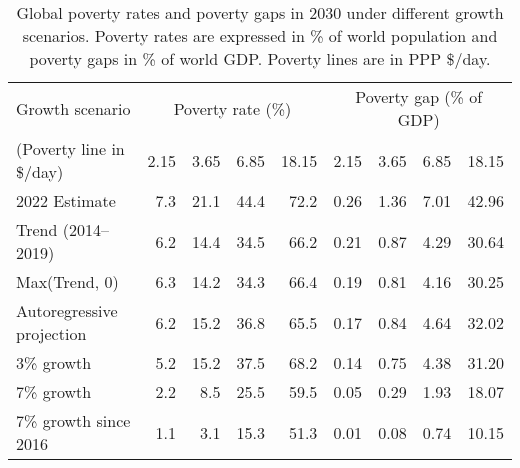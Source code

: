 \begin{table}[h]

\caption[Global poverty (rates and gaps) in 2030 under different growth scenarios.]{\label{tab:poverty}Global poverty rates and poverty gaps in 2030 under different growth scenarios. Poverty rates are expressed in \% of world population and poverty gaps in \% of world GDP. Poverty lines are in PPP \$/day.}
\centering
\begin{tabular}[t]{lrrrrrrrr}
\toprule Growth scenario & \multicolumn{4}{c}{Poverty rate (\%)} & \multicolumn{4}{c}{Poverty gap (\% of GDP)} \\ 
 (Poverty line in \$/day)  & 2.15 & 3.65 & 6.85 & 18.15 & 2.15 & 3.65 & 6.85 & 18.15\\
\midrule
2022 Estimate & 7.3 & 21.1 & 44.4 & 72.2 & 0.26 & 1.36 & 7.01 & 42.96\\
Trend (2014--2019) & 6.2 & 14.4 & 34.5 & 66.2 & 0.21 & 0.87 & 4.29 & 30.64\\
Max(Trend, 0) & 6.3 & 14.2 & 34.3 & 66.4 & 0.19 & 0.81 & 4.16 & 30.25\\
Autoregressive projection & 6.2 & 15.2 & 36.8 & 65.5 & 0.17 & 0.84 & 4.64 & 32.02\\
3\% growth & 5.2 & 15.2 & 37.5 & 68.2 & 0.14 & 0.75 & 4.38 & 31.20\\
7\% growth & 2.2 & 8.5 & 25.5 & 59.5 & 0.05 & 0.29 & 1.93 & 18.07\\
7\% growth since 2016 & 1.1 & 3.1 & 15.3 & 51.3 & 0.01 & 0.08 & 0.74 & 10.15\\
\bottomrule
\end{tabular}
\end{table}
